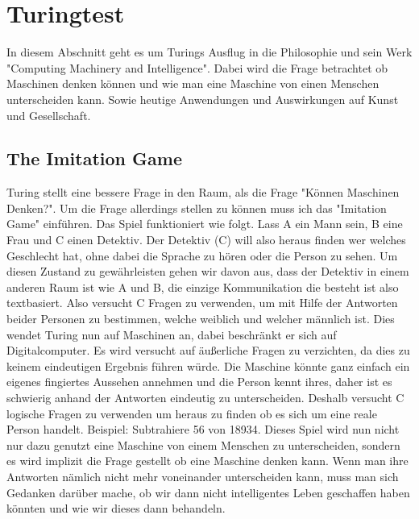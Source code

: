 \section{Turingtest}
\label{turingtest}
In diesem Abschnitt geht es um Turings Ausflug in die Philosophie und sein Werk "Computing Machinery and Intelligence". Dabei wird die Frage betrachtet ob Maschinen denken können und wie man eine Maschine von einen Menschen unterscheiden kann. Sowie heutige Anwendungen und Auswirkungen auf Kunst und Gesellschaft.
\subsection{The Imitation Game}
Turing stellt eine bessere Frage in den Raum, als die Frage "Können Maschinen Denken?". Um die Frage allerdings stellen zu können muss ich das "Imitation Game" einführen. Das Spiel funktioniert wie folgt. Lass A ein Mann sein, B eine Frau und C einen Detektiv. Der Detektiv (C) will also heraus finden wer welches Geschlecht hat, ohne dabei die Sprache zu hören oder die Person zu sehen. Um diesen Zustand zu gewährleisten gehen wir davon aus, dass der Detektiv in einem anderen Raum ist wie A und B, die einzige Kommunikation die besteht ist also textbasiert. Also versucht C Fragen zu verwenden, um mit Hilfe der Antworten beider Personen zu bestimmen, welche weiblich und welcher männlich ist. Dies wendet Turing nun auf Maschinen an, dabei beschränkt er sich auf Digitalcomputer. Es wird versucht auf äußerliche Fragen zu verzichten, da dies zu keinem eindeutigen Ergebnis führen würde. Die Maschine könnte ganz einfach ein eigenes fingiertes Aussehen annehmen und die Person kennt ihres, daher ist es schwierig anhand der Antworten eindeutig zu unterscheiden. Deshalb versucht C logische Fragen zu verwenden um heraus zu finden ob es sich um eine reale Person handelt. Beispiel: Subtrahiere 56 von 18934.\cite{computing} Dieses Spiel wird nun nicht nur dazu genutzt eine Maschine von einem Menschen zu unterscheiden, sondern es wird implizit die Frage gestellt ob eine Maschine denken kann. Wenn man ihre Antworten nämlich nicht mehr voneinander unterscheiden kann, muss man sich Gedanken darüber mache,  ob wir dann nicht intelligentes Leben geschaffen haben könnten und wie wir dieses dann behandeln.
